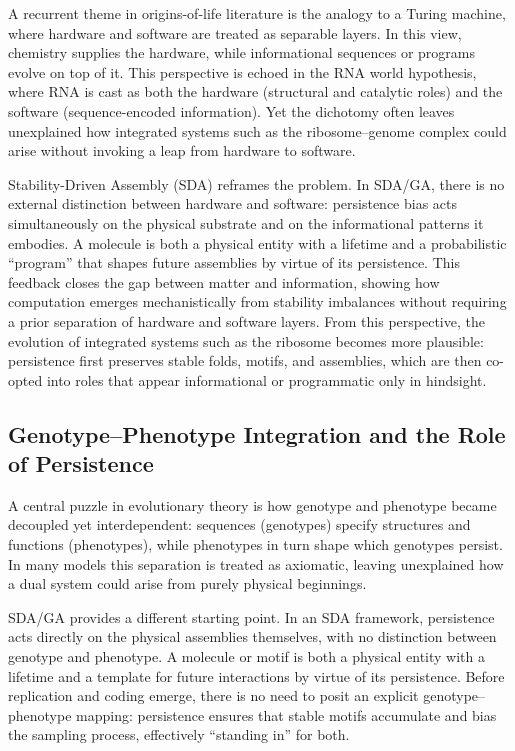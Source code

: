 \documentclass[life,article,submit,pdftex,moreauthors]{Definitions/mdpi}
\begin{document}
A recurrent theme in origins-of-life literature is the analogy to a Turing machine, 
where hardware and software are treated as separable layers. In this view, chemistry 
supplies the hardware, while informational sequences or programs evolve on top of it. 
This perspective is echoed in the RNA world hypothesis, where RNA is cast as both the 
hardware (structural and catalytic roles) and the software (sequence-encoded information). 
Yet the dichotomy often leaves unexplained how integrated systems such as the 
ribosome--genome complex could arise without invoking a leap from hardware to software.  

Stability-Driven Assembly (SDA) reframes the problem. In SDA/GA, there is no external 
distinction between hardware and software: persistence bias acts simultaneously on the 
physical substrate and on the informational patterns it embodies. A molecule is both a 
physical entity with a lifetime and a probabilistic “program” that shapes future 
assemblies by virtue of its persistence. This feedback closes the gap between matter 
and information, showing how computation emerges mechanistically from stability 
imbalances without requiring a prior separation of hardware and software layers.  
From this perspective, the evolution of integrated systems such as the ribosome becomes 
more plausible: persistence first preserves stable folds, motifs, and assemblies, which 
are then co-opted into roles that appear informational or programmatic only in hindsight.  

\subsection{Genotype--Phenotype Integration and the Role of Persistence}

A central puzzle in evolutionary theory is how genotype and phenotype became 
decoupled yet interdependent: sequences (genotypes) specify structures and functions 
(phenotypes), while phenotypes in turn shape which genotypes persist. In many models 
this separation is treated as axiomatic, leaving unexplained how a dual system could 
arise from purely physical beginnings.  

SDA/GA provides a different starting point. In an SDA framework, persistence acts 
directly on the physical assemblies themselves, with no distinction between 
genotype and phenotype. A molecule or motif is both a physical entity with a 
lifetime and a template for future interactions by virtue of its persistence. 
Before replication and coding emerge, there is no need to posit an explicit 
genotype–phenotype mapping: persistence ensures that stable motifs accumulate and 
bias the sampling process, effectively ``standing in'' for both.  
\end{document}
